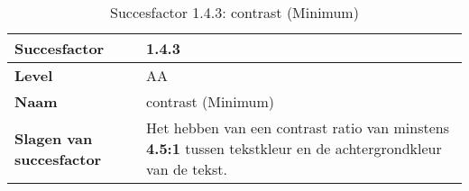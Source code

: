 \begin{table}[H]
    \centering
    \caption{Succesfactor 1.4.3: contrast (Minimum)}
    \begin{threeparttable}

 
    \hspace*{-1cm}\begin{tabular}{|l|p{12cm}|} 
        \hline
        \textbf{Succesfactor}                 & 1.4.3                                                                                                                                                                                                                                                                                                                                                                                                                                                                                                          \\ 
        \hline
        \textbf{Level}                        & AA                                                                                                                                                                                                                                                                                                                                                                                                                                                                                                                 \\ 
        \hline
        \textbf{Naam}                         & contrast (Minimum)~                                                                                                                                                                                                                                                                                                                                                                                                                                                                                      \\ 
        \hline
        \textbf{Slagen van succesfactor}      & Het hebben van een contrast ratio van minstens \textbf{4.5:1} tussen tekstkleur en de achtergrondkleur van de tekst.                                                                                                                                                                                                    \\ 
        \hline

\end{tabular}
\end{threeparttable}
\end{table}
